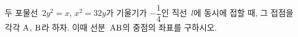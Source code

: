 두 포물선~$2y^2=x$, $x^2=32y$가 기울기가 $-\dfrac{1}{4}$인 직선~$l$에 동시에 접할 때, 그 접점을 각각 $\mathrm{A}$, $\mathrm{B}$라 하자. 이때 선분~$\mathrm{AB}$의 중점의 좌표를 구하시오.
